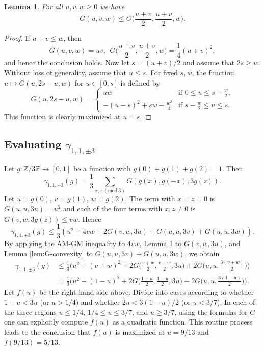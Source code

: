 \documentclass[12pt, notitlepage]{amsart}
\numberwithin{equation}{section}
\def\Z{\mathbb Z}
\newcommand{\Mod}[1]{\ (\mathrm{mod}\ #1)}
\newtheorem{lemma}[theorem]{Lemma}
\theoremstyle{remark}
\theoremstyle{definition}
\theoremstyle{remark}
\numberwithin{equation}{section}
\begin{document}
\begin{lemma}\label{lem:G-uv}
For all $u,v,w \geq 0$ we have 
$$
G(u,v,w) \leq G\Big(\frac{u+v}{2}, \frac{u+v}{2}, w\Big).
$$
\end{lemma}

\begin{proof}
If $u+v \leq w$, then 
$$
G(u,v,w) = uv, \ \ G\Big(\frac{u+v}{2}, \frac{u+v}{2}, w\Big) = \frac{1}{4}(u+v)^2,
$$
and hence the conclusion holds. Now let $s = (u+v)/2$ and assume that $2s \geq w$. Without loss of generality, assume that $u \leq s$. For fixed $s,w$, the function $u\mapsto G(u, 2s-u, w)$ for $u \in [0,s]$ is defined by
$$
G(u, 2s-u, w) = \begin{cases} uw & \text{if }0 \leq u \leq s-\frac{w}{2}, \\ -(u-s)^2 + sw-\frac{w^2}{4} & \text{if }s-\frac{w}{2} \leq u \leq s. \end{cases}
$$
This function is clearly maximized at $u = s$.
\end{proof}

\subsection{Evaluating $\gamma_{1,1,\pm 3}$}

Let $g: \Z/3\Z\rightarrow [0,1]$ be a function with $g(0)+g(1)+g(2)=1$. Then
$$
\gamma_{1,1,\pm 3}(g) = \frac{1}{3} \sum_{x,z\Mod{3}} G(g(x), g(-x), 3g(z)).
$$
Let $u = g(0)$, $v = g(1)$, $w = g(2)$. The term with $x=z=0$ is $G(u,u,3u) = u^2$ and each of the four terms with $x,z \neq 0$ is $G(v,w,3g(z)) \leq vw$.  Hence
$$
\gamma_{1,1,\pm 3}(g) \leq \frac{1}{3}(u^2 + 4vw + 2G(v,w,3u) + G(u,u,3v) + G(u,u,3w)).
$$
By applying the AM-GM inequality to $4vw$, Lemma \ref{lem:G-uv} to $G(v,w,3u)$, and Lemma \ref{lem:G-convexity} to $G(u,u,3v) + G(u,u,3w)$, we obtain
\begin{align*}
\gamma_{1,1,\pm 3}(g) &\leq   \frac{1}{3}\Big(u^2 + (v+w)^2 + 2G\Big(\frac{v+w}{2},\frac{v+w}{2},3u\Big) + 2G\Big(u,u,\frac{3(v+w)}{2}\Big)\Big) \\
&= \frac{1}{3}\Big(u^2 + (1-u)^2 + 2G\Big(\frac{1-u}{2},\frac{1-u}{2},3u\Big) + 2G\Big(u,u,\frac{3(1-u)}{2}\Big)\Big).
\end{align*}
Let $f(u)$ be the right-hand side above. Divide into cases according to whether $1-u < 3u$ (or $u > 1/4$) and whether $2u < 3(1-u)/2$ (or $u < 3/7$). In each of the three regions $u \leq 1/4$, $1/4 \leq u \leq 3/7$, and $u \geq 3/7$, using the formulas for $G$ one can explicitly compute $f(u)$ as a quadratic function. This routine process leads to the conclusion that $f(u)$ is maximized at $u = 9/13$ and $f(9/13) = 5/13$. 
\end{document}
